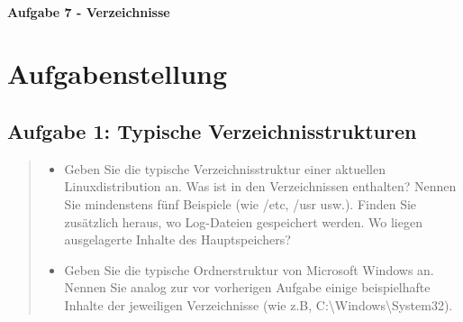\newpage

\paragraph{\LARGE Aufgabe 7 - Verzeichnisse}

\section{Aufgabenstellung}
	\subsection{Aufgabe 1: Typische Verzeichnisstrukturen}
		\begin{quote}
			\begin{itemize}
				\item Geben Sie die typische Verzeichnisstruktur einer aktuellen Linuxdistribution an. Was ist in den Verzeichnissen enthalten? Nennen Sie mindenstens f\"unf Beispiele (wie /etc, /usr usw.). Finden Sie zus\"atzlich heraus, wo Log-Dateien gespeichert werden. Wo liegen ausgelagerte Inhalte des Hauptspeichers?\\
				\item Geben Sie die typische Ordnerstruktur von Microsoft Windows an. Nennen Sie analog zur vor vorherigen Aufgabe einige beispielhafte Inhalte der jeweiligen Verzeichnisse (wie z.B, C:\textbackslash Windows\textbackslash System32).\\
			\end{itemize}
		\end{quote}
